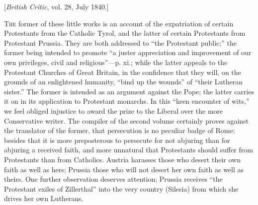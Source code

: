 
[\emph{British Critic}, vol. 28, July 1840.]

T\textsc{he} former of these
little works is an account of the expatriation of certain Protestants
from the Catholic Tyrol, and the latter of certain Protestants from
Protestant Prussia. They are both addressed to ``the Protestant public;''
the former being intended to promote ``a juster appreciation and
improvement of our own privileges, civil and religious''—p. xi.; while
the latter appeals to the Protestant Churches of Great Britain, in the
confidence that they will, on the grounds of an enlightened humanity, ``bind
up the wounds'' of ``their Lutheran sister.'' The former is intended as an
argument against the Pope; the latter carries it on in its application
to Protestant monarchs. In this ``keen encounter of wits,'' we feel
obliged injustice to award the prize to the Liberal over the more
Conservative writer. The compiler of the second volume certainly proves
against the translator of the former, that persecution is no peculiar
badge of Rome; besides that it is more preposterous to persecute for not
abjuring than for abjuring a received faith, and more unnatural that
Protestants should suffer from Protestants than from Catholics. Austria
harasses those who desert their own faith as well as hers; Prussia those
who will not desert her own faith as well as theirs. One further
observation deserves attention; Prussia receives ``the Protestant exiles
of Zillerthal'' into the very country (Silesia) from which she drives her
own Lutherans.

